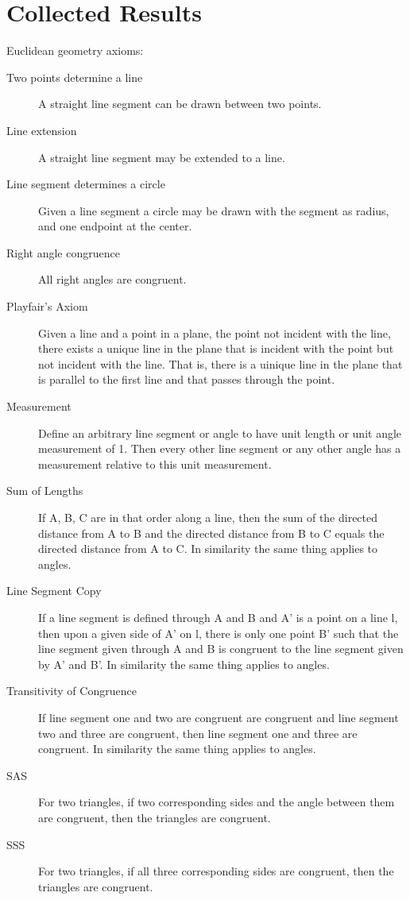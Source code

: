 \documentclass[12pt]{amsart}
\theoremstyle{remark}
\newtheorem*{basic notion}{Basic Notion}
\theoremstyle{mycomment}
\begin{document}
\section{Collected Results}
Euclidean geometry axioms:
\begin{description}
\item[Two points determine a line] A straight line segment can be drawn between two points.
\item[Line extension] A straight line segment may be extended to a line.
\item[Line segment determines a circle] Given a line segment a circle may be drawn with the segment as radius, and one endpoint at the center.
\item[Right angle congruence] All right angles are congruent.
\item[Playfair's Axiom] Given a line and a point in a plane, the point not incident with the line, there exists a unique line in the plane that is incident with the point but not incident with the line. That is, there is a uinique line in the plane that is parallel to the first line and that passes through the point.
\item[Measurement] Define an arbitrary line segment or angle to have unit length or unit angle measurement of 1. Then every other line segment or any other angle has a measurement relative to this unit measurement.
\item[Sum of Lengths] If A, B, C are in that order along a line, then the sum of the directed distance from A to B and the directed distance from B to C equals the directed distance from  A to C. In similarity the same thing applies to angles.
\item[Line Segment Copy] If  a line segment is defined through A and B and A' is a point on a line l, then upon a given side of A' on l, there is only one point B' such that the line segment given through A and B is congruent to the line segment given by A' and B'. In similarity the same thing applies to angles.
\item[Transitivity of Congruence] If line segment one and two are congruent are congruent and line segment two and three are congruent, then line segment one and three are congruent. In similarity the same thing applies to angles.
\item[SAS] For two triangles, if two corresponding sides and the angle between them are congruent, then the triangles are congruent. 
\item[SSS] For two triangles, if all three corresponding sides are congruent, then the triangles are congruent.
\end{description}
\end{document}
